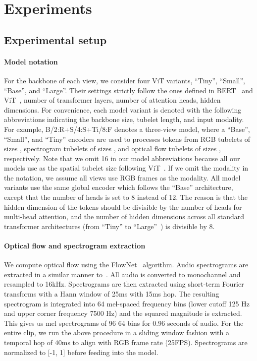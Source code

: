 \section{Experiments}
\subsection{Experimental setup}
\paragraph{Model notation} For the backbone of each view, we consider four ViT variants, ``Tiny'', ``Small'', ``Base'', and ``Large''. Their settings strictly follow the ones defined in BERT~\cite{devlin_naacl_2019} and ViT~\cite{dosovitskiy2020image}, \ie number of transformer layers, number of attention heads, hidden dimensions.
For convenience, each model variant is denoted with the following abbreviations indicating the backbone size, tubelet length, and input modality.
For example, B/2:R+S/4:S+Ti/8:F denotes a three-view model, where a ``Base'', ``Small'', and ``Tiny'' encoders are used to processes tokens from RGB tubelets of sizes , spectrogram tubelets of sizes , and optical flow tubelets of sizes , respectively.
Note that we omit 16 in our model abbreviations because all our models use  as the spatial tubelet size following ViT~\cite{dosovitskiy2020image}. If we omit the modality in the notation, we assume all views use RGB frames as the modality.
All model variants use the same global encoder which follows the ``Base'' architecture, except that the number of heads is set to 8 instead of 12. The reason is that the hidden dimension of the tokens should be divisible by the number of heads for multi-head attention, and the number of hidden dimensions across all standard transformer architectures (from ``Tiny'' to ``Large''~\cite{steiner2021augreg, dosovitskiy2020image}) is divisible by 8.

\paragraph{Optical flow and spectrogram extraction} 
We compute optical flow using the FlowNet~\cite{dosovitskiy2015flownet} algorithm. Audio spectrograms are extracted in a similar manner to~\cite{hershey2017cnn}. All audio is converted to monochannel and resampled to 16kHz. Spectrograms are then extracted using short-term Fourier transforms with a Hann window of 25ms with 15ms hop. The resulting spectrogram is integrated into
64 mel-spaced frequency bins (lower cutoff 125 Hz and upper corner frequency 7500 Hz) and the squared magnitude is extracted. This gives us mel spectrograms of 96  64 bins for 0.96 seconds of audio. For the entire clip, we run the above procedure in a sliding window fashion with a temporal hop of 40ms to align with RGB frame rate (25FPS). Spectrograms are normalized to [-1, 1] before feeding into the model.

